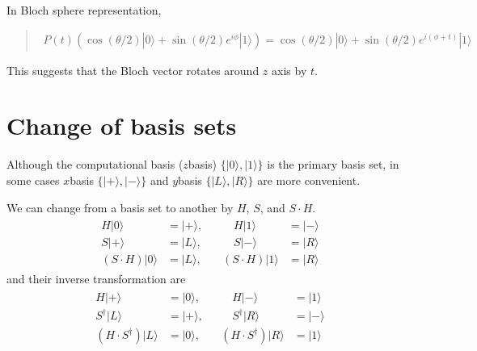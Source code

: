 \documentclass[letterpaper,10pt,english]{jupyterBook}
\begin{document}
\sphinxAtStartPar
In Bloch sphere representation,
\begin{quote}
\begin{equation*}
\begin{split}
P(t) \left( \cos(\theta/2)|0\rangle + \sin(\theta/2) e^{i\phi}|1\rangle\right) = \cos(\theta/2) |0\rangle + \sin(\theta/2) e^{i (\phi+t)} |1\rangle
\end{split}
\end{equation*}\end{quote}

\sphinxAtStartPar
This suggests that the Bloch vector rotates around \(z\) axis by \(t\).

\sphinxstepscope


\section{Change of basis sets}
\label{\detokenize{q1gates/change-basis:change-of-basis-sets}}\label{\detokenize{q1gates/change-basis:sec-change-basis}}\label{\detokenize{q1gates/change-basis::doc}}
\sphinxAtStartPar
Although the computational basis (\(z\)\sphinxhyphen{}basis) \(\{|0\rangle,|1\rangle\}\) is the primary basis set, in some cases \(x\)\sphinxhyphen{}basis \(\{|+\rangle,|-\rangle\}\) and \(y\)\sphinxhyphen{}basis \(\{|L\rangle,|R\rangle\}\) are more convenient.

\sphinxAtStartPar
We can change from a basis set to another by \(H\), \(S\), and \(S\cdot H\).
\begin{equation*}
\begin{split}
\begin{align}
H |0\rangle &= |+\rangle, & \quad H|1\rangle &= |-\rangle \\
S |+\rangle &= |L\rangle, &\quad S|-\rangle &= |R\rangle \\
(S\cdot H)|0\rangle &= |L\rangle, \quad & (S\cdot H)|1\rangle &= |R\rangle
\end{align}
\end{split}
\end{equation*}
\sphinxAtStartPar
and their inverse transformation are
\begin{equation*}
\begin{split}
\begin{align}
H |+\rangle &= |0\rangle, & \quad H|-\rangle &= |1\rangle \\
S^\dagger |L\rangle &= |+\rangle, &\quad S^\dagger|R\rangle &= |-\rangle \\
(H\cdot S^\dagger)|L\rangle &= |0\rangle, \quad & (H\cdot S^\dagger)|R\rangle &= |1\rangle
\end{align}
\end{split}
\end{equation*}
\end{document}
